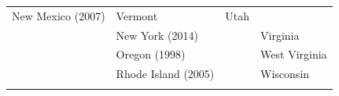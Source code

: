 \documentclass[11pt,]{article}
\begin{document}
\begin{longtable}[]{@{}llll@{}}
\begin{minipage}[t]{0.26\columnwidth}
New Mexico (2007)\strut
\end{minipage} & \begin{minipage}[t]{0.24\columnwidth}\raggedright
Vermont\strut
\end{minipage} & \begin{minipage}[t]{0.19\columnwidth}\raggedright
Utah\strut
\end{minipage}\tabularnewline
\begin{minipage}[t]{0.20\columnwidth}\raggedright
\strut
\end{minipage} & \begin{minipage}[t]{0.26\columnwidth}\raggedright
New York (2014)\strut
\end{minipage} & \begin{minipage}[t]{0.24\columnwidth}\raggedright
\strut
\end{minipage} & \begin{minipage}[t]{0.19\columnwidth}\raggedright
Virginia\strut
\end{minipage}\tabularnewline
\begin{minipage}[t]{0.20\columnwidth}\raggedright
\strut
\end{minipage} & \begin{minipage}[t]{0.26\columnwidth}\raggedright
Oregon (1998)\strut
\end{minipage} & \begin{minipage}[t]{0.24\columnwidth}\raggedright
\strut
\end{minipage} & \begin{minipage}[t]{0.19\columnwidth}\raggedright
West Virginia\strut
\end{minipage}\tabularnewline
\begin{minipage}[t]{0.20\columnwidth}\raggedright
\strut
\end{minipage} & \begin{minipage}[t]{0.26\columnwidth}\raggedright
Rhode Island (2005)\strut
\end{minipage} & \begin{minipage}[t]{0.24\columnwidth}\raggedright
\strut
\end{minipage} & \begin{minipage}[t]{0.19\columnwidth}\raggedright
Wisconsin\strut
\end{minipage}\tabularnewline
\begin{minipage}[t]{0.20\columnwidth}\raggedright
\strut
\end{minipage} & \begin{minipage}[t]{0.26\columnwidth}\raggedright

\end{minipage}
\end{longtable}
\end{document}
